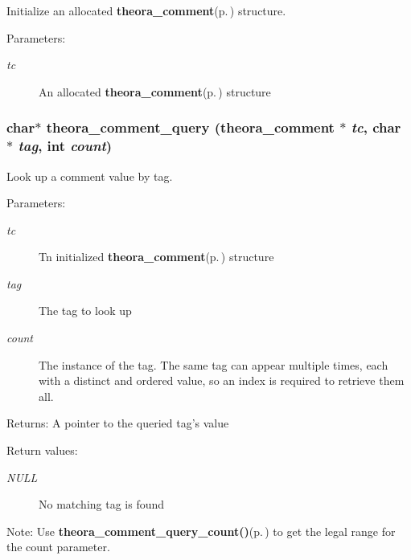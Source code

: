 Initialize an allocated {\bf theora\_\-comment}{\rm (p.\,\pageref{structtheora__comment})} structure. 

\begin{Desc}
\item[Parameters:]
\begin{description}
\item[{\em tc}]An allocated {\bf theora\_\-comment}{\rm (p.\,\pageref{structtheora__comment})} structure \end{description}
\end{Desc}
\subsubsection{\setlength{\rightskip}{0pt plus 5cm}char$\ast$ theora\_\-comment\_\-query ({\bf theora\_\-comment} $\ast$ {\em tc}, char $\ast$ {\em tag}, int {\em count})}\label{theora_8h_0071768c54009941f50d7c738a33340d}


Look up a comment value by tag. 

\begin{Desc}
\item[Parameters:]
\begin{description}
\item[{\em tc}]Tn initialized {\bf theora\_\-comment}{\rm (p.\,\pageref{structtheora__comment})} structure \item[{\em tag}]The tag to look up \item[{\em count}]The instance of the tag. The same tag can appear multiple times, each with a distinct and ordered value, so an index is required to retrieve them all. \end{description}
\end{Desc}
\begin{Desc}
\item[Returns:]A pointer to the queried tag's value \end{Desc}
\begin{Desc}
\item[Return values:]
\begin{description}
\item[{\em NULL}]No matching tag is found\end{description}
\end{Desc}
\begin{Desc}
\item[Note:]Use {\bf theora\_\-comment\_\-query\_\-count()}{\rm (p.\,\pageref{theora_8h_d0ee4a15b96518d5d8ab38df814c0b27})} to get the legal range for the count parameter. \end{Desc}
